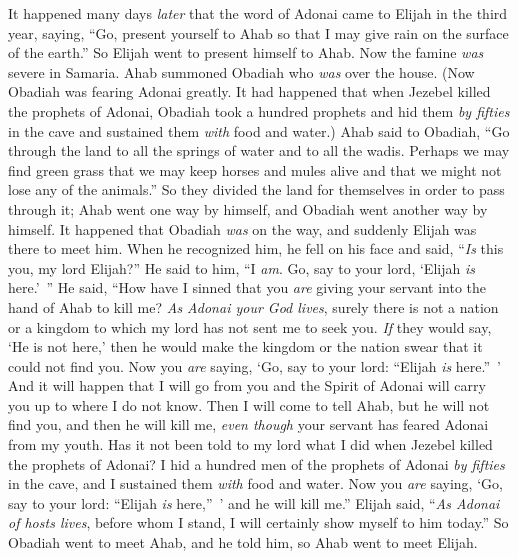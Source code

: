 \begin{biblechapter} %
 It happened many days \textit{later} that the word of Adonai came to Elijah in the third year, saying, “Go, present yourself to Ahab so that I may give rain on the surface of the earth.”
\verse So Elijah went to present himself to Ahab. Now the famine \textit{was} severe in Samaria.
\verse Ahab summoned Obadiah who \textit{was} over the house. (Now Obadiah was fearing Adonai greatly.
\verse It had happened that when Jezebel killed the prophets of Adonai, Obadiah took a hundred prophets and hid them \textit{by fifties} in the cave and sustained them \textit{with} food and water.)
\verse Ahab said to Obadiah, “Go through the land to all the springs of water and to all the wadis. Perhaps we may find green grass that we may keep horses and mules alive and that we might not lose any of the animals.”
\verse So they divided the land for themselves in order to pass through it; Ahab went one way by himself, and Obadiah went another way by himself.
\verse It happened that Obadiah \textit{was} on the way, and suddenly Elijah was there to meet him. When he recognized him, he fell on his face and said, “\textit{Is} this you, my lord Elijah?”
\verse He said to him, “I \textit{am}. Go, say to your lord, ‘Elijah \textit{is} here.’ ”
\verse He said, “How have I sinned that you \textit{are} giving your servant into the hand of Ahab to kill me?
\verse \textit{As Adonai your God lives}, surely there is not a nation or a kingdom to which my lord has not sent me to seek you. \textit{If} they would say, ‘He is not here,’ then he would make the kingdom or the nation swear that it could not find you.
\verse Now you \textit{are} saying, ‘Go, say to your lord: “Elijah \textit{is} here.” ’
\verse And it will happen that I will go from you and the Spirit of Adonai will carry you up to where I do not know. Then I will come to tell Ahab, but he will not find you, and then he will kill me, \textit{even though} your servant has feared Adonai from my youth.
\verse Has it not been told to my lord what I did when Jezebel killed the prophets of Adonai? I hid a hundred men of the prophets of Adonai \textit{by fifties} in the cave, and I sustained them \textit{with} food and water.
\verse Now you \textit{are} saying, ‘Go, say to your lord: “Elijah \textit{is} here,” ’ and he will kill me.”
\verse Elijah said, “\textit{As Adonai of hosts lives}, before whom I stand, I will certainly show myself to him today.”
\verse So Obadiah went to meet Ahab, and he told him, so Ahab went to meet Elijah.

\end{biblechapter}
